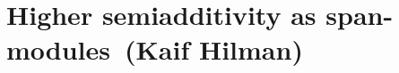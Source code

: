 \renewcommand{\thespeaker}{Kaif Hilman}
\renewcommand{\thetitle}{Higher semiadditivity as span-modules}

\section{\thetitle~(\thespeaker)}



\providecommand{\verticalPullback}{\mathbin{\rotatebox[origin=c]{-45}{$\lrcorner$}}}
\providecommand{\semiadditivites}{\text{SAdd}}
\providecommand{\removeTop}{_{\text{p}}}
\providecommand{\starCategory}{\text{St}}
\providecommand{\Qcons}{\text{Q}}
\providecommand{\fibfunc}{\underline{\text{fun}}}
\providecommand{\Tlexact}{^{\underline{\text{lex}}}}
\providecommand{\Trexact}{^{\underline{\text{rex}}}}
\providecommand{\vop}{^{\text{vop}}}
\providecommand{\Tperfect}{^{\underline{\text{perf}}}}
\providecommand{\Tstable}{\text{T-st}}
\providecommand{\stable}{\text{st}}
\providecommand{\kapColim}{^{(\kappa)}}
\providecommand{\filtered}{^{\text{filt}}}
\providecommand{\fibrewise}{^{\text{fb-}}}
\providecommand{\lexact}{^{\text{lex}}}
\providecommand{\rexact}{^{\text{rex}}}
\providecommand{\opds}{\text{Opds}}
\providecommand{\operad}{\mathcal{O}}
\providecommand{\Nil}{\text{Nil}}
\providecommand{\covar}{_{\star}}
\providecommand{\semiadd}{^{\text{sadd}}}
\providecommand{\linear}{\text{Lin}}
\providecommand{\inert}{^{\text{inert}}}
\providecommand{\dayconv}{\text{Day}}
\providecommand{\finstar}{\text{Fin}_*}
\providecommand{\GW}{\operatorname{GW}}
\providecommand{\free}{^{\text{free}}}
\providecommand{\accessible}{{\text{Acc}}}
\providecommand{\leftfib}{^{\text{left}}}
\providecommand{\primeIdeal}{\mathfrak{p}}
\providecommand{\localising}{\operatorname{Loc}}
\providecommand{\bord}{\operatorname{bord}}
\providecommand{\orbital}{\text{Orbit}}
\providecommand{\LTheory}{\mathcal{L}}
\providecommand{\hyperbolise}{^{\text{hyp}}}
\providecommand{\bordify}{^{\text{bord}}}
\providecommand{\cobspectrum}{\mathbb{C}\operatorname{ob}}
\providecommand{\cgroup}{\text{CGrp}}
\providecommand{\cmonoid}{\text{CMon}}
\providecommand{\surgery}{\operatorname{Surg}}
\providecommand{\completeSegalAnima}{\operatorname{CSAn}}
\providecommand{\asscat}{\operatorname{asscat}}
\providecommand{\posets}{\operatorname{Posets}}
\providecommand{\bcyl}{\operatorname{bcyl}}
\providecommand{\sequence}{\operatorname{Seq}}
\providecommand{\pair}{\operatorname{Pair}}
\providecommand{\grothWitt}{\mathcal{GW}}
\providecommand{\biadjoint}{^{\text{bi}}}
\providecommand{\GW}{\operatorname{GW}}
